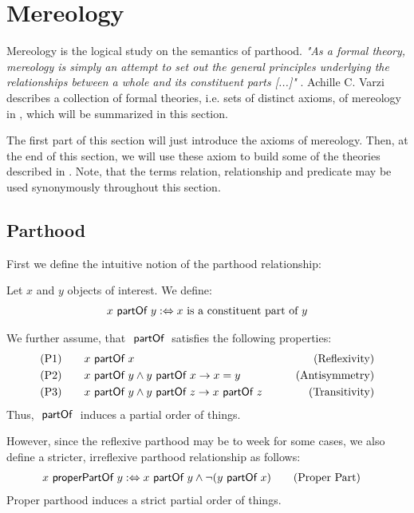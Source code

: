 \section{Mereology}
\label{section:Mereology}

Mereology is the logical study on the semantics of parthood.
\textit{"As a formal theory, mereology is simply
an attempt to set out the general principles underlying the relationships between a whole and its constituent parts [...]"} \cite{DBLP:journals/dke/Varzi96}.
Achille C. Varzi describes a collection of formal theories, i.e. sets of distinct axioms, of mereology in \cite{DBLP:journals/dke/Varzi96}, which will be summarized in this section.



The first part of this section will just introduce the axioms of mereology.
Then, at the end of this section, we will use these axiom to build some of the theories described in \cite{DBLP:journals/dke/Varzi96}.
Note, that the terms relation, relationship and predicate may be used synonymously throughout this section.

\subsection{Parthood}
\label{subsection:Parthood}
First we define the intuitive notion of the parthood relationship:
\begin{definition}[$\partOf$]
Let $x$ and $y$ objects of interest.
We define:
\begin{align}
x ~\textsf{partOf}~ y
:\Leftrightarrow
x \text{ is a constituent part of } y
\end{align}
\end{definition}
We further assume, that $\partOf$ satisfies the following properties:
\begin{align}
&\text{(P1)}
\qquad x ~\textsf{partOf}~ x 
&\qquad \text{(Reflexivity)}
\\
&\text{(P2)}
\qquad x ~\textsf{partOf}~ y \wedge y ~\textsf{partOf}~ x \rightarrow x = y
&\qquad \text{(Antisymmetry)}
\\
&\text{(P3)}
\qquad x ~\textsf{partOf}~ y \wedge y ~\textsf{partOf}~ z \rightarrow x ~\textsf{partOf}~ z
&\qquad \text{(Transitivity)}
\end{align}
Thus, $\partOf$ induces a partial order of things.

However, since the reflexive parthood may be to week for some cases, we also define a stricter, irreflexive parthood relationship as follows:
\begin{align}
x ~\textsf{properPartOf}~ y
:\Leftrightarrow
x ~\textsf{partOf}~ y \wedge \neg(y ~\textsf{partOf}~ x)
&\qquad \text{(Proper Part)}
\label{definition:ProperPart}
\end{align}
Proper parthood induces a strict partial order of things.

